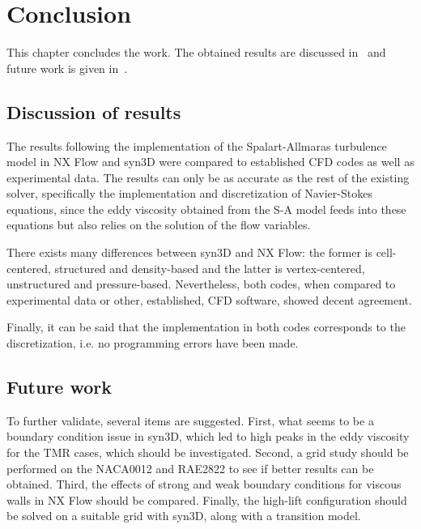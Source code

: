 \chapter{Conclusion}
This chapter concludes the work. The obtained results are discussed in~ and future work is given in~.

\section{Discussion of results}
\label{sec:conclusionresults}
The results following the implementation of the Spalart-Allmaras turbulence model in NX Flow and syn3D were compared to established CFD codes as well as experimental data. The results can only be as accurate as the rest of the existing solver, specifically the implementation and discretization of Navier-Stokes equations, since the eddy viscosity obtained from the S-A model feeds into these equations but also relies on the solution of the flow variables.

There exists many differences between syn3D and NX Flow: the former is cell-centered, structured and density-based and the latter is vertex-centered, unstructured and pressure-based. Nevertheless, both codes, when compared to experimental data or other, established, CFD software, showed decent agreement.

Finally, it can be said that the implementation in both codes corresponds to the discretization, i.e. no programming errors have been made.

\section{Future work}
\label{sec:future}
To further validate, several items are suggested. First, what seems to be a boundary condition issue in syn3D, which led to high peaks in the eddy viscosity for the TMR cases, which should be investigated. Second, a grid study should be performed on the NACA0012 and RAE2822 to see if better results can be obtained. Third, the effects of strong and weak boundary conditions for viscous walls in NX Flow should be compared. Finally, the high-lift configuration should be solved on a suitable grid with syn3D, along with a transition model.
